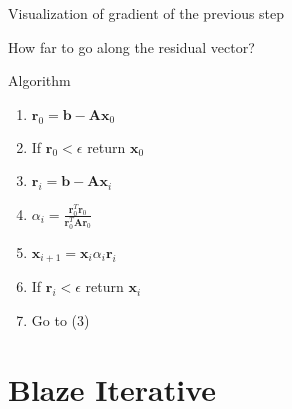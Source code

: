 \documentclass[12pt,t]{beamer}
\begin{document}
\begin{frame}{Visualization of gradient of the previous step}
\begin{center}
\end{center}
\begin{center}
How far to go along the residual vector?
\end{center}
\end{frame}

\begin{frame}{Algorithm}

\begin{enumerate}
\item $\mathbf{r}_0 = \mathbf{b} - \mathbf{A} \mathbf{x}_0$
\item If $\mathbf{r}_0 < \epsilon$ return $\mathbf{x}_0$
\item $\mathbf{r}_i = \mathbf{b} - \mathbf{A} \mathbf{x}_i$
\item $\alpha_i = \frac{\mathbf{r}^T_0 \mathbf{r}_0}{\mathbf{r}^T_0 \mathbf{A}\mathbf{r}_0}$
\item $\mathbf{x}_{i+1} = \mathbf{x}_i \alpha_i \mathbf{r}_i$
\item If $\mathbf{r}_i < \epsilon$ return  $\mathbf{x}_i$ 
\item Go to (3)
\end{enumerate}


\end{frame}






\section{Blaze Iterative}
\end{document}
